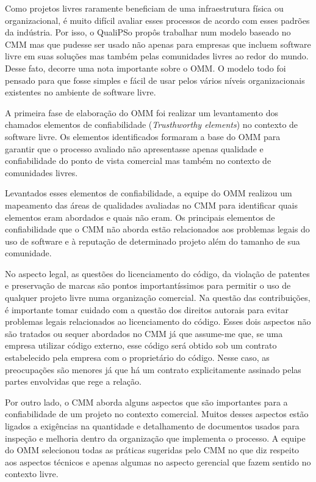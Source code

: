 Como projetos livres raramente beneficiam de uma infraestrutura física
ou organizacional, é muito difícil avaliar esses processos de acordo
com esses padrões da indústria. Por isso, o QualiPSo propôs trabalhar
num modelo baseado no CMM mas que pudesse ser usado não apenas para
empresas que incluem software livre em suas soluções mas também pelas
comunidades livres ao redor do mundo. Desse fato, decorre uma nota
importante sobre o OMM. O modelo todo foi pensado para que fosse
simples e fácil de usar pelos vários níveis organizacionais existentes
no ambiente de software livre.

A primeira fase de elaboração do OMM foi realizar um levantamento dos
chamados elementos de confiabilidade (\textit{Trusthworthy elements})
no contexto de software livre. Os elementos identificados formaram a
base do OMM para garantir que o processo avaliado não apresentasse
apenas qualidade e confiabilidade do ponto de vista comercial mas
também no contexto de comunidades livres.

Levantados esses elementos de confiabilidade, a equipe do OMM realizou
um mapeamento das áreas de qualidades avaliadas no CMM para
identificar quais elementos eram abordados e quais não eram. Os
principais elementos de confiabilidade que o CMM não aborda estão
relacionados aos problemas legais do uso de software e à reputação de
determinado projeto além do tamanho de sua comunidade.

No aspecto legal, as questões do licenciamento do código, da violação
de patentes e preservação de marcas são pontos importantíssimos para
permitir o uso de qualquer projeto livre numa organização
comercial. Na questão das contribuições, é importante tomar cuidado
com a questão dos direitos autorais para evitar problemas legais
relacionados ao licenciamento do código. Esses dois aspectos não são
tratados ou sequer abordados no CMM já que assume-me que, se uma
empresa utilizar código externo, esse código será obtido sob um
contrato estabelecido pela empresa com o proprietário do código. Nesse
caso, as preocupações são menores já que há um contrato explicitamente
assinado pelas partes envolvidas que rege a relação.

Por outro lado, o CMM aborda alguns aspectos que são importantes para
a confiabilidade de um projeto no contexto comercial. Muitos desses
aspectos estão ligados a exigências na quantidade e detalhamento de
documentos usados para inspeção e melhoria dentro da organização que
implementa o processo. A equipe do OMM selecionou todas as práticas
sugeridas pelo CMM no que diz respeito aos aspectos técnicos e apenas
algumas no aspecto gerencial que fazem sentido no contexto livre.

